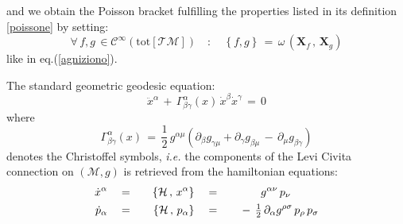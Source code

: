 \documentclass[10pt,a4paper]{article}
\newcommand{\ft}[2]{{\textstyle\frac{#1}{#2}}}
\begin{document}
and we obtain the Poisson bracket fulfilling the properties listed in its definition \ref{poissone} by setting:
\begin{equation}\label{curmatore}
\forall \, f,g \, \in \mathcal{C}^\infty\left(\mathrm{tot}\left[\mathcal{TM}\right] \right)\quad : \quad \left\{f,g\right\} \, = \, \omega\,\left(\boldsymbol{X}_f
\, , \, \boldsymbol{X}_g\right)
\end{equation}
like in eq.(\ref{agniziono}).
\par
The standard geometric geodesic equation:
\begin{equation}\label{geodequate}
  \ddot{x}^\alpha \, + \, \Gamma^\alpha_{\beta\gamma}(x)\,
  \dot{x}^\beta \dot{x}^\gamma \, = \, 0
\end{equation}
where
\begin{equation}\label{cristoffelo}
  \Gamma^\alpha_{\beta\gamma}(x) \, = \, \ft 12 \, g^{\alpha\mu} \left(\partial_\beta g_{\gamma\mu} + \partial_\gamma g_{\beta\mu}\, - \, \partial_\mu g_{\beta\gamma} \right)
\end{equation}
denotes the Christoffel symbols, \textit{i.e.} the components of the Levi Civita connection on $(\mathcal{M},g)$ is retrieved
 from the hamiltonian equations:
\begin{alignat}{6}\label{hamilleque}
  \dot{x}^\alpha \quad & = &\quad \left\{\mathcal{H}\, , \, x^\alpha \right\} \quad& = &\quad &\phantom{-\, \ft 12\,\,} g^{\alpha\nu} \, p_\nu  \null \nonumber \\
 \dot{p}_\alpha \quad & = &\quad \left\{\mathcal{H}\, , \, p_\alpha \right\} \quad& = & \quad & - \, \ft 12 \, \partial_\alpha g^{\rho\sigma} \, p_\rho\,p_\sigma  \null
\end{alignat}
\end{document}
